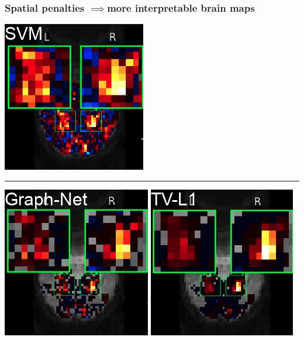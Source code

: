 \documentclass{beamer}
\def\leadto{$\mathbf{\implies}$}
\begin{document}
\begin{frame}
  \frametitle{Spatial penalties \leadto more interpretable brain maps}
  \centering
  {\includegraphics[width=.28\textwidth]{svm_with_title.png}}

  \medskip
  
  \hrule
  
  \medskip
  {\includegraphics[width=.28\textwidth]{graphnet_with_title.png}}
  {\includegraphics[width=.28\textwidth]{tvl1_with_title.png}}

\end{frame}

\end{document}
